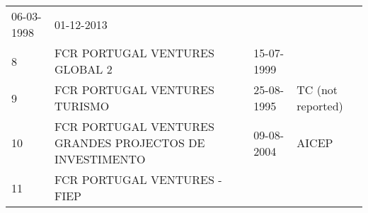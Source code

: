 \documentclass[]{book}
\theoremstyle{definition}
\theoremstyle{definition}
\theoremstyle{definition}
\theoremstyle{remark}
\begin{document}
\begin{longtable}[]{@{}llll@{}}
\begin{minipage}[t]{0.17\columnwidth}
06-03-1998\strut
\end{minipage} & \begin{minipage}[t]{0.17\columnwidth}\raggedright\strut
01-12-2013\strut
\end{minipage}\tabularnewline
\begin{minipage}[t]{0.17\columnwidth}\raggedright\strut
8\strut
\end{minipage} & \begin{minipage}[t]{0.17\columnwidth}\raggedright\strut
FCR PORTUGAL VENTURES GLOBAL 2\strut
\end{minipage} & \begin{minipage}[t]{0.17\columnwidth}\raggedright\strut
15-07-1999\strut
\end{minipage}\tabularnewline
\begin{minipage}[t]{0.17\columnwidth}\raggedright\strut
9\strut
\end{minipage} & \begin{minipage}[t]{0.17\columnwidth}\raggedright\strut
FCR PORTUGAL VENTURES TURISMO\strut
\end{minipage} & \begin{minipage}[t]{0.17\columnwidth}\raggedright\strut
25-08-1995\strut
\end{minipage} & \begin{minipage}[t]{0.17\columnwidth}\raggedright\strut
TC (not reported)\strut
\end{minipage}\tabularnewline
\begin{minipage}[t]{0.17\columnwidth}\raggedright\strut
10\strut
\end{minipage} & \begin{minipage}[t]{0.17\columnwidth}\raggedright\strut
FCR PORTUGAL VENTURES GRANDES PROJECTOS DE INVESTIMENTO\strut
\end{minipage} & \begin{minipage}[t]{0.17\columnwidth}\raggedright\strut
09-08-2004\strut
\end{minipage} & \begin{minipage}[t]{0.17\columnwidth}\raggedright\strut
AICEP\strut
\end{minipage}\tabularnewline
\begin{minipage}[t]{0.17\columnwidth}\raggedright\strut
11\strut
\end{minipage} & \begin{minipage}[t]{0.17\columnwidth}\raggedright\strut
FCR PORTUGAL VENTURES - FIEP\strut
\end{minipage} & \begin{minipage}[t]{0.17\columnwidth}\raggedright\strut

\end{minipage}
\end{longtable}
\end{document}
